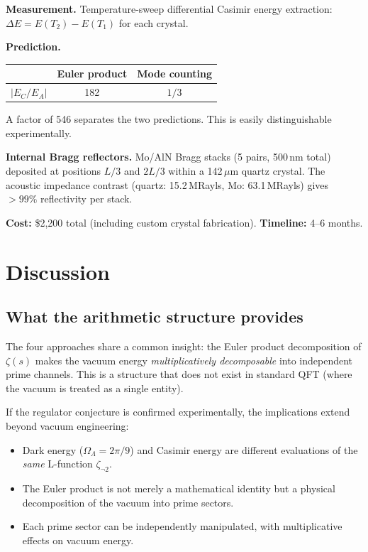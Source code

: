\documentclass[aps,prd,twocolumn,superscriptaddress,nofootinbib]{revtex4-2}
\begin{document}
\textbf{Measurement.} Temperature-sweep differential Casimir energy
extraction: $\Delta E = E(T_2) - E(T_1)$ for each crystal.

\textbf{Prediction.}
\begin{center}
\begin{tabular}{lcc}
\toprule
& Euler product & Mode counting \\
\midrule
$|E_C / E_A|$ & 182 & $1/3$ \\
\bottomrule
\end{tabular}
\end{center}

A factor of 546 separates the two predictions.
This is easily distinguishable experimentally.

\textbf{Internal Bragg reflectors.}
Mo/AlN Bragg stacks (5 pairs, 500\,nm total) deposited at positions
$L/3$ and $2L/3$ within a 142\,$\mu$m quartz crystal.
The acoustic impedance contrast (quartz: 15.2\,MRayls,
Mo: 63.1\,MRayls) gives $> 99\%$ reflectivity per stack.

\textbf{Cost:} \$2{,}200 total (including custom crystal fabrication).
\textbf{Timeline:} 4--6 months.

\section{Discussion}

\subsection{What the arithmetic structure provides}

The four approaches share a common insight: the Euler product
decomposition of $\zeta(s)$ makes the vacuum energy \emph{multiplicatively
decomposable} into independent prime channels.
This is a structure that does not exist in standard QFT
(where the vacuum is treated as a single entity).

If the regulator conjecture is confirmed experimentally,
the implications extend beyond vacuum engineering:
\begin{itemize}
\item Dark energy ($\Omega_\Lambda = 2\pi/9$) and Casimir energy
  are different evaluations of the \emph{same} L-function $\zeta_{\neg 2}$.
\item The Euler product is not merely a mathematical identity
  but a physical decomposition of the vacuum into prime sectors.
\item Each prime sector can be independently manipulated,
  with multiplicative effects on vacuum energy.
\end{itemize}
\end{document}
